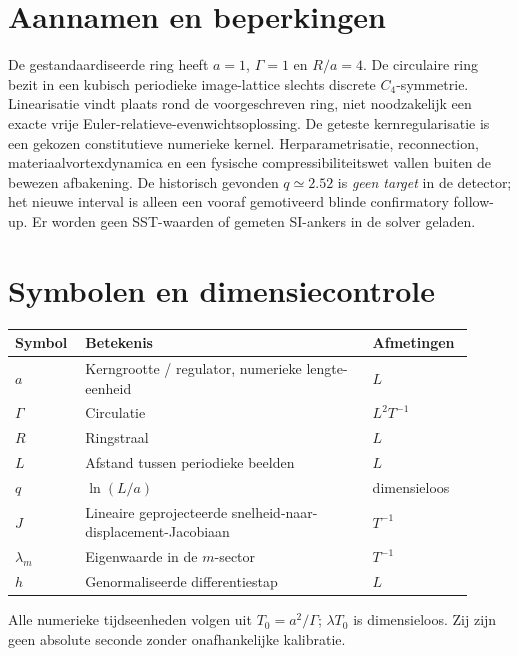 \documentclass[11pt,a4paper]{article}
\begin{document}
\section{Aannamen en beperkingen}
De gestandaardiseerde ring heeft $a=1$, $\Gamma=1$ en $R/a=4$. De circulaire ring bezit in een kubisch periodieke image-lattice slechts discrete $C_4$-symmetrie. Linearisatie vindt plaats rond de voorgeschreven ring, niet noodzakelijk een exacte vrije Euler-relatieve-evenwichtsoplossing.
De geteste kernregularisatie is een gekozen constitutieve numerieke kernel. Herparametrisatie, reconnection, materiaalvortexdynamica en een fysische compressibiliteitswet vallen buiten de bewezen afbakening. De historisch gevonden $q\simeq2.52$ is \emph{geen target} in de detector; het nieuwe interval is alleen een vooraf gemotiveerd blinde confirmatory follow-up. Er worden geen SST-waarden of gemeten SI-ankers in de solver geladen.

\section{Symbolen en dimensiecontrole}
\begin{longtable}{p{0.14\linewidth}p{0.59\linewidth}p{0.18\linewidth}}\toprule
Symbol & Betekenis & Afmetingen \\ \midrule
$a$ & Kerngrootte / regulator, numerieke lengte-eenheid & $L$ \\
$\Gamma$ & Circulatie & $L^2T^{-1}$ \\
$R$ & Ringstraal & $L$ \\
$L$ & Afstand tussen periodieke beelden & $L$ \\
$q$ & $\ln(L/a)$ & dimensieloos \\
$J$ & Lineaire geprojecteerde snelheid-naar-displacement-Jacobiaan & $T^{-1}$ \\
$\lambda_m$ & Eigenwaarde in de $m$-sector & $T^{-1}$ \\
$h$ & Genormaliseerde differentiestap & $L$ \\ \bottomrule\end{longtable}
Alle numerieke tijdseenheden volgen uit $T_0=a^2/\Gamma$; $\lambda T_0$ is dimensieloos. Zij zijn geen absolute seconde zonder onafhankelijke kalibratie.

\end{document}
